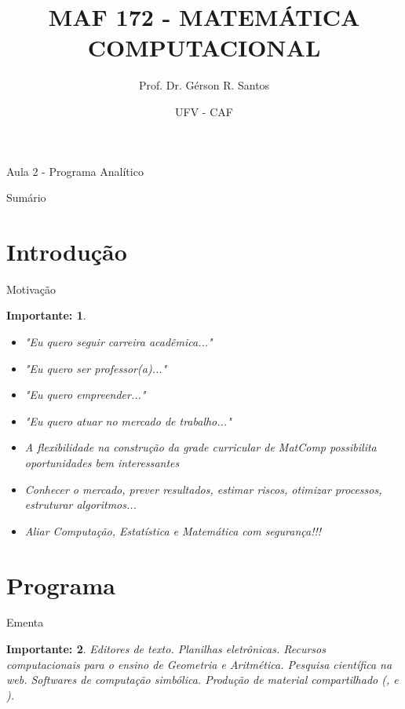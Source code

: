 \documentclass{beamer}
\title{MAF 172 - MATEMÁTICA COMPUTACIONAL}
\author{Prof. Dr. Gérson R. Santos}
\date{UFV - CAF}
\newtheorem{teoc}{Importante:} %
\begin{document}

\begin{frame}{Aula 2 - Programa Analítico}
    \maketitle
\end{frame}


\begin{frame}{Sumário}
    \tableofcontents
\end{frame}


\section{Introdução}

\begin{frame}{Motivação}
    
	\begin{teoc}
		\begin{itemize}
			\item "Eu quero seguir carreira acadêmica..."
			\item "Eu quero ser professor(a)..."
			\item "Eu quero empreender..."
			\item "Eu quero atuar no mercado de trabalho..."
			\item A flexibilidade na construção da grade curricular de MatComp possibilita oportunidades bem interessantes
			\item Conhecer o mercado, prever resultados, estimar riscos, otimizar processos, estruturar algoritmos...
			\item Aliar Computação, Estatística e Matemática com segurança!!!
		\end{itemize}
	\end{teoc}
\end{frame}


\section{Programa}

\begin{frame}{Ementa}
    
	\begin{teoc}
        Editores de texto. Planilhas eletrônicas. Recursos computacionais para o ensino de Geometria e Aritmética. Pesquisa científica na web. Softwares de computação simbólica. Produção de material compartilhado
        (\cite{wanner2003introduccao}, \cite{wickham2016r} e \cite{bragancca2016introduccao}). 
	\end{teoc}
	
\end{frame}
\end{document}
